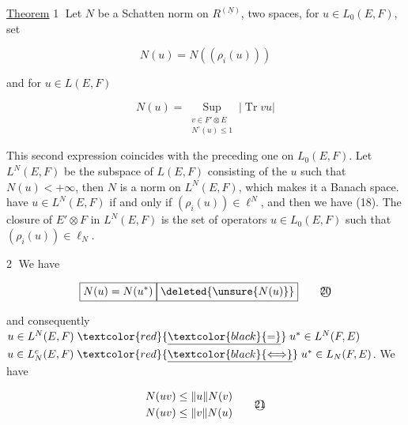 
\uline{Theorem} \textcircled{1} Let $N$ be a Schatten norm on $R^{(\underline N)}$,  two  spaces,  for $u\in L_0(E,F)$, set

\[
N(u)=N((\rho_i(u)))\tag*{(18)}
\]

and for $u\in L(E,F)$

\[
N(u)=\underset{\substack{v\in F'\otimes E\\N^\circ(u)\leq 1}}{\operatorname{Sup}}|\operatorname{Tr}vu|\tag*{(19)}
\]

This second expression coincides with the preceding one on $L_0(E,F)$. Let $L^N(E,F)$ be the subspace of $L(E,F)$ consisting of the $u$ such that $N(u)<+\infty$, then $N$ is a norm on $L^N(E,F)$, which makes it a Banach space.   have $u\in L^N(E,F)$ if and only if $(\rho_i(u))\in\ell^N$, and then we have (18).  The closure  of $E'\otimes F$ in $L^N(E,F)$ is the set of  operators $u\in L_0(E,F)$ such that $(\rho_i(u))\in\ell_N$.

\textcircled{2} We have

\[
\boxed{N(u)=N(u^*)}\boxed{\deleted{\unsure{N(u)}}}\tag*{\textcircled{20}}
\]

and consequently $u\in L^N(E,F)\mathrel{\textcolor{red}{\underline{\textcolor{black}{=}}}}u^*\in L^N(F,E)$
 $u\in L_N^c(E,F)\mathrel{\textcolor{red}{\underline{\textcolor{black}{\Longleftrightarrow}}}}u^*\in L_N(F,E)$. We have

\[
\begin{aligned}
N(uv)&\leq\lVert u\rVert N(v)\\
N(uv)&\leq\lVert v\rVert N(u)
\end{aligned}\tag*{\textcircled{21}}
\]

